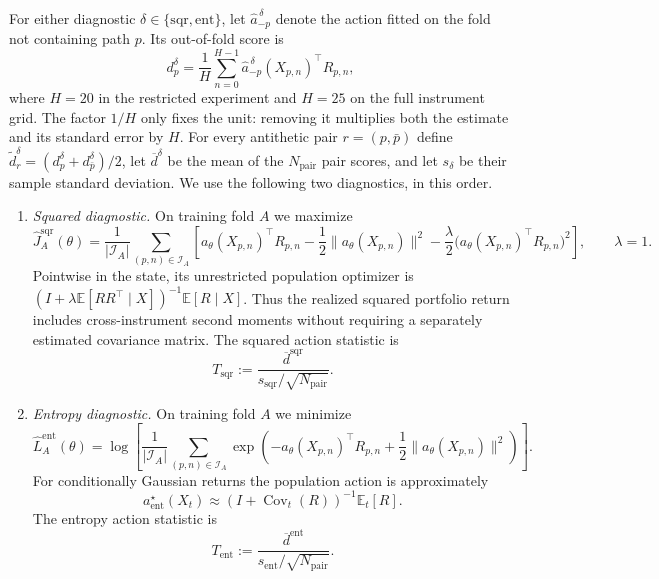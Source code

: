 \documentclass[11pt]{article}
\newcommand{\E}{\mathbb E}
\newcommand{\abs}[1]{\lvert #1\rvert}
\theoremstyle{plain}
\theoremstyle{definition}
\theoremstyle{remark}
\begin{document}
For either diagnostic $\delta\in\{\mathrm{sqr},\mathrm{ent}\}$, let
$\widehat a_{-p}^{\,\delta}$ denote the action fitted on the fold not
containing path $p$.  Its out-of-fold score is
\begin{equation}\label{eq:numerics-action-path-score}
  d_p^\delta
  =\frac1H\sum_{n=0}^{H-1}
    \widehat a_{-p}^{\,\delta}(X_{p,n})^\top R_{p,n},
\end{equation}
where $H=20$ in the restricted experiment and $H=25$ on the full instrument
grid.  The factor $1/H$ only fixes the unit: removing it multiplies both the
estimate and its standard error by $H$.  For every antithetic pair
$r=(p,\bar p)$ define
$\widetilde d_r^\delta=(d_p^\delta+d_{\bar p}^\delta)/2$, let
$\overline d^\delta$ be the mean of the $N_{\mathrm{pair}}$ pair scores, and
let $s_\delta$ be their sample standard deviation.  We use the following two
diagnostics, in this order.

\begin{enumerate}[label=(\roman*)]
\item \emph{Squared diagnostic.}
  On training fold $A$ we maximize
  \begin{equation}\label{eq:numerics-squared-objective}
    \widehat J_A^{\mathrm{sqr}}(\theta)
    =\frac{1}{\abs{\mathcal I_A}}
      \sum_{(p,n)\in\mathcal I_A}
      \left[
        a_\theta(X_{p,n})^\top R_{p,n}
        -\frac12\lVert a_\theta(X_{p,n})\rVert^2
        -\frac{\lambda}{2}
          \bigl(a_\theta(X_{p,n})^\top R_{p,n}\bigr)^2
      \right],
      \qquad \lambda=1.
  \end{equation}
  Pointwise in the state, its unrestricted population optimizer is
  $(I+\lambda\E[RR^\top\mid X])^{-1}\E[R\mid X]$.  Thus the realized squared
  portfolio return includes cross-instrument second moments without requiring
  a separately estimated covariance matrix.  The squared action statistic is
  \begin{equation}\label{eq:numerics-t-sqr}
    T_{\mathrm{sqr}}
    :=\frac{\overline d^{\mathrm{sqr}}}
      {s_{\mathrm{sqr}}/\sqrt{N_{\mathrm{pair}}}}.
  \end{equation}

\item \emph{Entropy diagnostic.}
  On training fold $A$ we minimize
  \begin{equation}\label{eq:numerics-entropy-objective}
    \widehat L_A^{\mathrm{ent}}(\theta)
    =\log\!\left[
      \frac{1}{\abs{\mathcal I_A}}
      \sum_{(p,n)\in\mathcal I_A}
      \exp\!\left(
        -a_\theta(X_{p,n})^\top R_{p,n}
        +\frac12\lVert a_\theta(X_{p,n})\rVert^2
      \right)
    \right].
  \end{equation}
  For conditionally Gaussian returns the population action is
  approximately
  \[
    a_{\mathrm{ent}}^\star(X_t)
    \approx (I+\operatorname{Cov}_t(R))^{-1}\E_t[R].
  \]
  The entropy action statistic is
  \begin{equation}\label{eq:numerics-t-ent}
    T_{\mathrm{ent}}
    :=\frac{\overline d^{\mathrm{ent}}}
      {s_{\mathrm{ent}}/\sqrt{N_{\mathrm{pair}}}}.
  \end{equation}
\end{enumerate}
\end{document}
